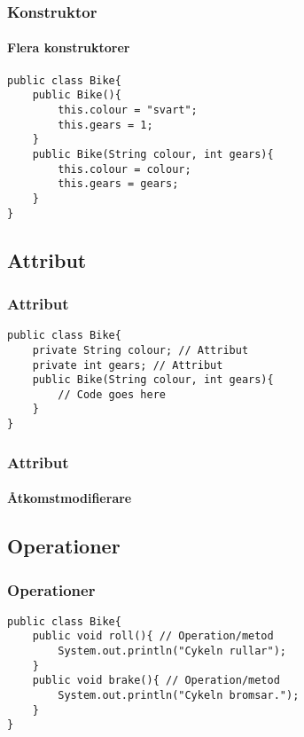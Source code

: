 \documentclass[aspectratio=169]{beamer}
\begin{document}
\begin{frame}[fragile]
    \frametitle{Konstruktor}
    \framesubtitle{Flera konstruktorer}

    \begin{lstlisting}
public class Bike{
    public Bike(){
        this.colour = "svart";
        this.gears = 1;
    }
    public Bike(String colour, int gears){
        this.colour = colour;
        this.gears = gears;
    }
}
    \end{lstlisting}


\end{frame}

\subsection{Attribut}

\begin{frame}[fragile]
    \frametitle{Attribut}



    \begin{lstlisting}
public class Bike{
    private String colour; // Attribut
    private int gears; // Attribut
    public Bike(String colour, int gears){
        // Code goes here
    }
}
    \end{lstlisting}

\end{frame}

\begin{frame}
    \frametitle{Attribut}
    \framesubtitle{Åtkomstmodifierare}




\end{frame}

\subsection{Operationer}

\begin{frame}[fragile]
    \frametitle{Operationer}


    \begin{lstlisting}
public class Bike{
    public void roll(){ // Operation/metod
        System.out.println("Cykeln rullar");
    }
    public void brake(){ // Operation/metod
        System.out.println("Cykeln bromsar.");
    }
}
    \end{lstlisting}

\end{frame}
\end{document}
